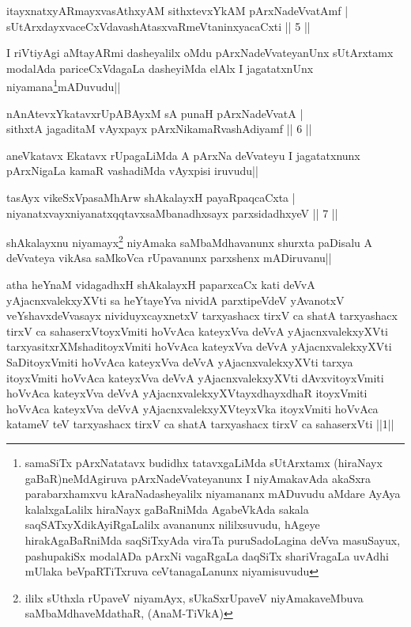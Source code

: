 \begin{shl}
itayxnatxyARmayxvasAthxyAM sithxtevxYkAM pArxNadeVvatAmf |\\
sUtArxdayxvaceCxVdavashAtasxvaRmeVtaninxyacaCxti \hfill || 5 ||
\end{shl}

\begin{artha}
I riVtiyAgi aMtayARmi dasheyalilx oMdu pArxNadeVvateyanUnx sUtArxtamx modalAda pariceCxVdagaLa dasheyiMda elAlx I jagatatxnUnx niyamana\footnote[1]{samaSiTx pArxNatatavx budidhx tatavxgaLiMda sUtArxtamx (hiraNayx gaBaR)neMdAgiruva pArxNadeVvateyanunx I niyAmakavAda akaSxra parabarxhamxvu kAraNadasheyalilx niyamananx mADuvudu aMdare AyAya kalalxgaLalilx hiraNayx gaBaRniMda AgabeVkAda sakala saqSATxyXdikAyiRgaLalilx avananunx nililxsuvudu, hAgeye hirakAgaBaRniMda saqSiTxyAda viraTa puruSadoLagina deVva masuSayux, pashupakiSx modalADa pArxNi vagaRgaLa daqSiTx shariVragaLa uvAdhi mUlaka beVpaRTiTxruva ceVtanagaLanunx niyamisuvudu}mADuvudu||
\end{artha}

\begin{shl}
nAnAtevxYkatavxrUpABAyxM sA punaH pArxNadeVvatA |\\
sithxtA jagaditaM vAyxpayx pArxNikamaRvashAdiyamf \hfill || 6 ||
\end{shl}

\begin{artha}
aneVkatavx Ekatavx rUpagaLiMda A pArxNa deVvateyu I jagatatxnunx pArxNigaLa kamaR vashadiMda vAyxpisi iruvudu||
\end{artha}

\begin{shl}
tasAyx vikeSxVpasaMhArw shAkalayxH payaRpaqcaCxta |\\
niyanatxvayxniyanatxqqtavxsaMbanadhxsayx parxsidadhxyeV \hfill || 7 ||
\end{shl}

\begin{artha}
shAkalayxnu niyamayx\footnote[2]{ililx sUthxla rUpaveV niyamAyx, sUkaSxrUpaveV niyAmakaveMbuva saMbaMdhaveMdathaR, (AnaM-TiVkA)} niyAmaka saMbaMdhavanunx shurxta paDisalu A deVvateya vikAsa saMkoVca rUpavanunx parxshenx mADiruvanu||
\end{artha}

\begin{shl}
atha heYnaM vidagadhxH shAkalayxH paparxcaCx kati deVvA yAjacnxvalekxyXVti sa heYtayeYva nividA parxtipeVdeV yAvanotxV veYshavxdeVvasayx nividuyxcayxnetxV tarxyashacx tirxV ca shatA tarxyashacx tirxV ca sahaserxVtoyxVmiti hoVvAca kateyxVva deVvA yAjacnxvalekxyXVti tarxyasitxrXMshaditoyxVmiti hoVvAca kateyxVva deVvA yAjacnxvalekxyXVti SaDitoyxVmiti hoVvAca kateyxVva deVvA yAjacnxvalekxyXVti tarxya itoyxVmiti hoVvAca kateyxVva deVvA yAjacnxvalekxyXVti dAvxvitoyxVmiti hoVvAca kateyxVva deVvA yAjacnxvalekxyXVtayxdhayxdhaR itoyxVmiti hoVvAca kateyxVva deVvA yAjacnxvalekxyXVteyxVka itoyxVmiti hoVvAca katameV teV tarxyashacx tirxV ca shatA tarxyashacx tirxV ca sahaserxVti ||1||
\end{shl}

